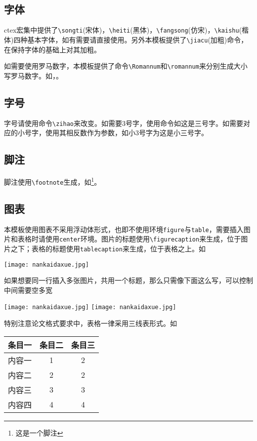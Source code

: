 \subsection{字体}
ctex宏集中提供了\verb|\songti|({\songti 宋体})，\verb|\heiti|({\heiti 黑体})，\verb|\fangsong|({\fangsong 仿宋})，\verb|\kaishu|({\kaishu 楷体})四种基本字体，如有需要请直接使用。另外本模板提供了\verb|\jiacu|({\jiacu 加粗})命令，在保持字体的基础上对其加粗。

如需要使用罗马数字，本模板提供了命令\verb|\Romannum|和\verb|\romannum|来分别生成大小写罗马数字。如，。
\subsection{字号}
字号请使用命令\verb|\zihao|来改变。如需要3号字，使用命令如{这是三号字}。如需要对应的小号字，使用其相反数作为参数，如小3号字为{这是小三号字}。
\subsection{脚注}
脚注使用\verb|\footnote|生成，如\footnote{这是一个脚注}。
\subsection{图表}
本模板使用图表不采用浮动体形式，也即不使用环境\verb|figure|与\verb|table|，需要插入图片和表格时请使用\verb|center|环境。图片的标题使用\verb|\figurecaption|来生成，位于图片之下；表格的标题使用\verb|tablecaption|来生成，位于表格之上。如
\begin{center}
	\texttt{[image: nankaidaxue.jpg]}
\end{center}
如果想要同一行插入多张图片，共用一个标题，那么只需像下面这么写，可以控制中间需要空多宽
\begin{center}
	\texttt{[image: nankaidaxue.jpg]}\hspace{0.8cm}
	\texttt{[image: nankaidaxue.jpg]}
\end{center}
特别注意论文格式要求中，表格一律采用三线表形式。如
\begin{center}
	\begin{tabular}{ccc}
		\hline
		条目一 & 条目二 & 条目三 \\ \hline
		内容一 &   1   &    2   \\
		内容二 &   2   &    2   \\
		内容三 &   3   &    3   \\
		内容四 &   4   &    4   \\ \hline
	\end{tabular}
\end{center}
